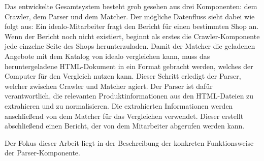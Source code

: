 Das entwickelte Gesamtsystem besteht grob gesehen aus drei Komponenten: dem Crawler, dem Parser und dem Matcher.
Der mögliche Datenfluss sieht dabei wie folgt aus:
Ein idealo-Mitarbeiter fragt den Bericht für einen bestimmten Shop an.
Wenn der Bericht noch nicht existiert, beginnt als erstes die Crawler-Komponente jede einzelne Seite des Shops
herunterzuladen.
Damit der Matcher die geladenen Angebote mit dem Katalog von idealo vergleichen kann, muss das heruntergeladene
HTML-Dokument in ein Format gebracht werden, welches der Computer für den Vergleich nutzen kann.
Dieser Schritt erledigt der Parser, welcher zwischen Crawler und Matcher agiert.
Der Parser ist dafür verantwortlich, die relevanten Produktinformationen aus den HTML-Dateien zu extrahieren und zu
normalisieren.
Die extrahierten Informationen werden anschließend von dem Matcher für das Vergleichen verwendet.
Dieser erstellt abschließend einen Bericht, der von dem Mitarbeiter abgerufen werden kann.

Der Fokus dieser Arbeit liegt in der Beschreibung der konkreten Funktionsweise der Parser-Komponente.